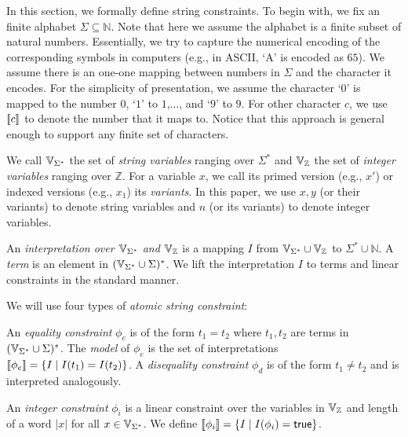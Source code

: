 \documentclass[sigplan,review,anonymous]{acmart}\settopmatter{printfolios=true,printccs=false,printacmref=false}
\begin{document}
In this section, we formally define string constraints. To begin with, we fix an finite alphabet $\Sigma \subseteq \mathbb{N}$. Note that here we assume the alphabet is a finite subset of natural numbers. Essentially, we try to capture the numerical encoding of the corresponding symbols in computers (e.g., in ASCII, `A' is encoded as $65$). We assume there is an one-one mapping between numbers in $\Sigma$ and the character it encodes. For the simplicity of presentation, we assume the character `$0$' is mapped to the number $0$, `$1$' to $1$,$\ldots$, and `$9$' to $9$. For other character $c$, we use $[\![c]\!]$ to denote the number that it maps to. Notice that this approach is general enough to support any finite set of characters. 


We call $\mbox{$\mathbb{V}_{\Sigma^*}$}$ the set of \emph{string variables} ranging over $\Sigma^*$ and $\mbox{$\mathbb{V}_{\mathbb{Z}}$}$ the set of \emph{integer variables} ranging over $\mathbb{Z}$.
For a variable $x$, we call its primed version (e.g., $x'$) or indexed versions (e.g., $x_1$) its \emph{variants}.
In this paper, we use $x,y$ (or their variants) to denote string variables and $n$ (or its variants) to denote integer variables.

An \emph{interpretation over $\mbox{$\mathbb{V}_{\Sigma^*}$}$ and $\mbox{$\mathbb{V}_{\mathbb{Z}}$}$} is a mapping $I$ from $\mbox{$\mathbb{V}_{\Sigma^*}$}\cup \mbox{$\mathbb{V}_{\mathbb{Z}}$}$ to $\Sigma^* \cup \mathbb{N}$. A \emph{term} is an element in $(\mbox{$\mathbb{V}_{\Sigma^*}$}\cup \Sigma)^*$. We lift the interpretation $I$ to terms and linear constraints in the standard manner. 

We will use four types of \emph{atomic string constraint}: 

An \emph{equality constraint} $\phi_e$ is of the form $t_1 = t_2$ where $t_1, 
t_2$ are terms in $(\mbox{$\mathbb{V}_{\Sigma^*}$}\cup \Sigma)^*$. The \emph{model} of $\phi_e$ is the set of interpretations $[\![\phi_e]\!]=\{I\mid 
I(t_1)=I(t_2)\}$. A \emph{disequality constraint} $\phi_d$ is of the form $t_1 \neq 
t_2$ and is interpreted analogously.

An \emph{integer constraint} $\phi_i$ is a linear constraint over the variables in $\mbox{$\mathbb{V}_{\mathbb{Z}}$}$ and length of a word $|x|$ for all $x \in \mbox{$\mathbb{V}_{\Sigma^*}$}$.
We define $[\![\phi_i]\!]= \{I \mid I(\phi_i)= \mbox{$\mathsf{true}$} \}$.
\end{document}
